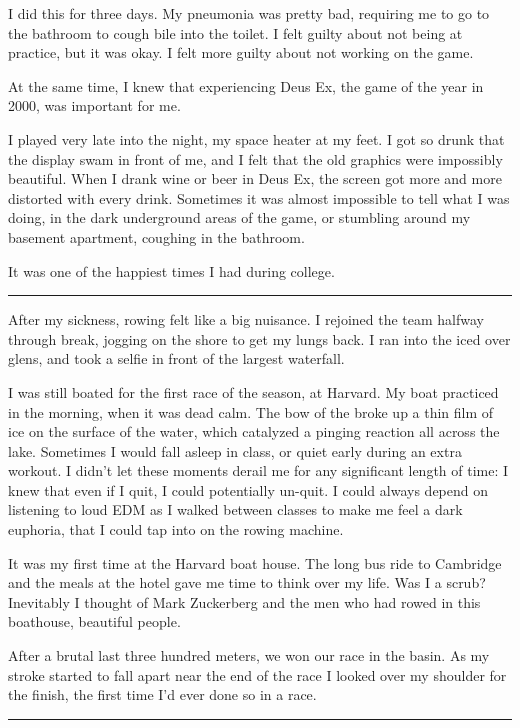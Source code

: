 I did this for three days.  My pneumonia was pretty bad, requiring me to go to
the bathroom to cough bile into the toilet.  I felt guilty about not being at
practice, but it was okay.  I felt more guilty about not working on the game.


At the same time, I knew that experiencing Deus Ex, the game of the year in
2000, was important for me.

I played very late into the night, my space heater at my feet.  I got so drunk
that the display swam in front of me, and I felt that the old graphics were
impossibly beautiful.  When I drank wine or beer in Deus Ex, the screen got more
and more distorted with every drink.  Sometimes it was almost impossible to tell
what I was doing, in the dark underground areas of the game, or stumbling around
my basement apartment, coughing in the bathroom.

It was one of the happiest times I had during college.

\plainfancybreak{12pt}{2}{* * *}

After my sickness, rowing felt like a big nuisance.  I rejoined the team halfway
through break, jogging on the shore to get my lungs back.  I ran into the iced
over glens, and took a selfie in front of the largest waterfall.  

I was still boated for the first race of the season, at Harvard.  My boat
practiced in the morning, when it was dead calm.  The bow of the broke up a thin
film of ice on the surface of the water, which catalyzed a pinging reaction all
across the lake.  Sometimes I would fall asleep in class, or quiet early during
an extra workout.  I didn't let these moments derail me for any significant
length of time: I knew that even if I quit, I could potentially un-quit.  I
could always depend on listening to loud EDM as I walked between classes to make
me feel a dark euphoria, that I could tap into on the rowing machine.

It was my first time at the Harvard boat house.  The long bus ride to Cambridge
and the meals at the hotel gave me time to think over my life.  Was I a scrub?
Inevitably I thought of Mark Zuckerberg and the men who had rowed in this
boathouse, beautiful people. 

After a brutal last three hundred meters, we won our race in the basin.  As my
stroke started to fall apart near the end of the race I looked over my shoulder
for the finish, the first time I'd ever done so in a race.

\plainfancybreak{12pt}{2}{* * *}

